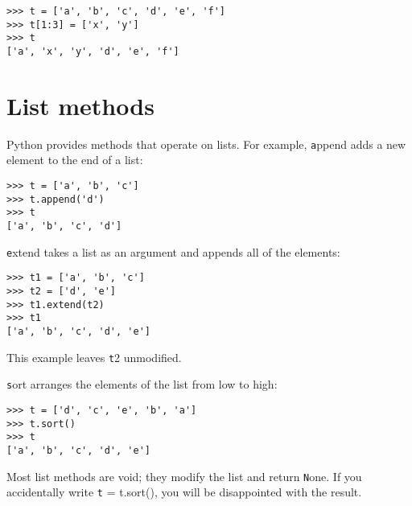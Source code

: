 \documentclass[
DIV=11,
fontsize=12,
twoside,
headinclude=false,
titlepage=firstiscover,
abstract=true,
headsepline=true,
footsepline=true,
chapterprefix=true, %
headings=big,
bibliography=totoc,%
captions=tableheading
]{scrbook}
\theoremstyle{definition}
\begin{document}
\begin{lstlisting}
>>> t = ['a', 'b', 'c', 'd', 'e', 'f']
>>> t[1:3] = ['x', 'y']
>>> t
['a', 'x', 'y', 'd', 'e', 'f']
\end{lstlisting}
%


%

%


\section{List methods}

Python provides methods that operate on lists.  For example,
{\texttt append} adds a new element to the end of a list:

\begin{lstlisting}
>>> t = ['a', 'b', 'c']
>>> t.append('d')
>>> t
['a', 'b', 'c', 'd']
\end{lstlisting}
%
{\texttt extend} takes a list as an argument and appends all of
the elements:

\begin{lstlisting}
>>> t1 = ['a', 'b', 'c']
>>> t2 = ['d', 'e']
>>> t1.extend(t2)
>>> t1
['a', 'b', 'c', 'd', 'e']
\end{lstlisting}
%
This example leaves {\texttt t2} unmodified.

{\texttt sort} arranges the elements of the list from low to high:

\begin{lstlisting}
>>> t = ['d', 'c', 'e', 'b', 'a']
>>> t.sort()
>>> t
['a', 'b', 'c', 'd', 'e']
\end{lstlisting}
%
Most list methods are void; they modify the list and return {\texttt None}.
If you accidentally write {\texttt t = t.sort()}, you will be disappointed
with the result.
\end{document}
